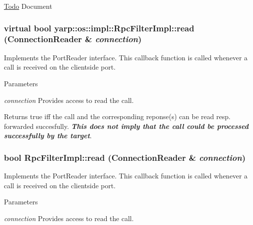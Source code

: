 \label{classyarp_1_1os_1_1impl_1_1_rpc_filter_impl_a9ee7fb8756ba19285866308cdf1d60c2}
\begin{Desc}
\item[\hyperlink{todo__todo000002}{Todo}]Document \end{Desc}
\hypertarget{classyarp_1_1os_1_1impl_1_1_rpc_filter_impl_a58d85a00cf2de35238822d7674d98cf1}{
\subsubsection[{read}]{\setlength{\rightskip}{0pt plus 5cm}virtual bool yarp::os::impl::RpcFilterImpl::read (ConnectionReader \& {\em connection})}}
\label{classyarp_1_1os_1_1impl_1_1_rpc_filter_impl_a58d85a00cf2de35238822d7674d98cf1}
Implements the PortReader interface. This callback function is called whenever a call is received on the clientside port. 
\begin{DoxyParams}{Parameters}
\item[{\em connection}]Provides access to read the call. \end{DoxyParams}
\begin{DoxyReturn}{Returns}
true iff the call and the corresponding reponse(s) can be read resp. forwarded succesfully. {\itshape {\bfseries This does not imply that the call could be processed successfully by the target}\/}. 
\end{DoxyReturn}
\hypertarget{classyarp_1_1os_1_1impl_1_1_rpc_filter_impl_ab8ff43bc5f1f926aa49185818fdfe3b7}{
\subsubsection[{read}]{\setlength{\rightskip}{0pt plus 5cm}bool RpcFilterImpl::read (ConnectionReader \& {\em connection})}}
\label{classyarp_1_1os_1_1impl_1_1_rpc_filter_impl_ab8ff43bc5f1f926aa49185818fdfe3b7}
Implements the PortReader interface. This callback function is called whenever a call is received on the clientside port. 
\begin{DoxyParams}{Parameters}
\item[{\em connection}]Provides access to read the call. \end{DoxyParams}
